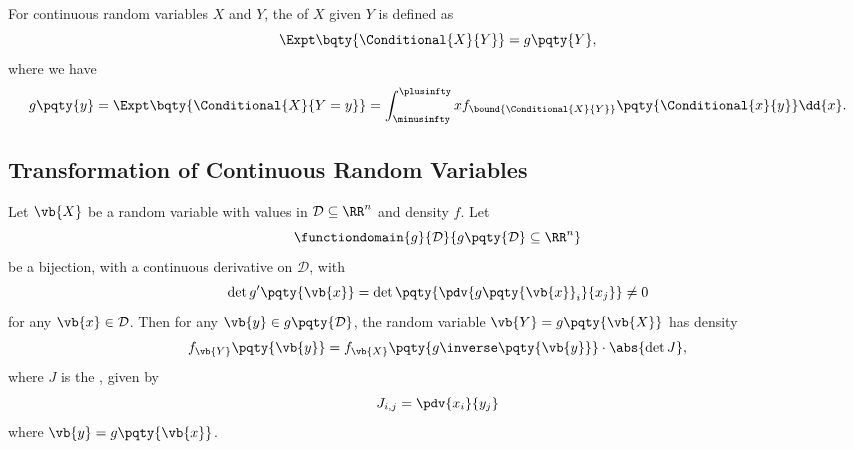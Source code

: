 \begin{definition}
    \label{def:conditional-expectation-crv}%
    For continuous random variables \(X\) and \(Y\), the  of \(X\) given \(Y\) is defined as
    \[
        \Expt\bqty{\Conditional{X}{Y}} = g\pqty{Y},
    \]
    where we have
    \[
        g\pqty{y} = \Expt\bqty{\Conditional{X}{Y = y}} = \int_{\minusinfty}^{\plusinfty} x f_{\bound{\Conditional{X}{Y}}} \pqty{\Conditional{x}{y}} \dd{x}.
    \]
\end{definition}

\subsection{Transformation of Continuous Random Variables}

\begin{theorem}
    \label{thm:transformation-joint-continuous-random-variable}%
    Let \(\vb{X}\) be a random variable with values in \(\mathcal{D} \subseteq \RR^n\) and density \(f\). Let
    \[
        \functiondomain{g}{\mathcal{D}}{g\pqty{\mathcal{D}} \subseteq \RR^n}
    \]
    be a bijection, with a continuous derivative on \(\mathcal{D}\), with
    \[
        \det g'\pqty{\vb{x}} = \det \pqty{\pdv{g\pqty{\vb{x}}_i}{x_j}} \neq 0
    \]
    for any \(\vb{x} \in \mathcal{D}\). Then for any \(\vb{y} \in g\pqty{\mathcal{D}}\), the random variable \(\vb{Y} = g\pqty{\vb{X}}\) has density
    \[
        f_{\vb{Y}}\pqty{\vb{y}} = f_{\vb{X}} \pqty{g\inverse\pqty{\vb{y}}} \cdot \abs{\det J},
    \]
    where \(J\) is the , given by
    \[
        J_{i, j} = \pdv{x_i}{y_j}
    \]
    where \(\vb{y} = g\pqty{\vb{x}}\).
\end{theorem}

